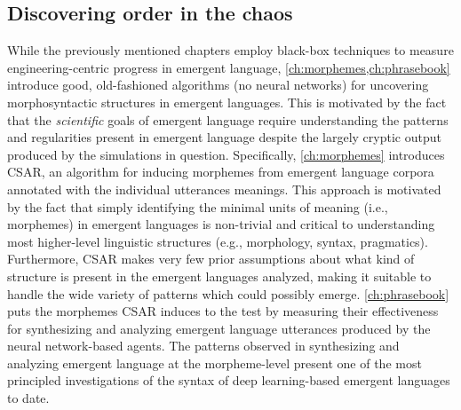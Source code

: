 \subsection{Discovering order in the chaos}%
\label{sec:intro-morph}

While the previously mentioned chapters employ black-box techniques to measure engineering-centric progress in emergent language, \cref{ch:morphemes,ch:phrasebook} introduce good, old-fashioned algorithms (no neural networks) for uncovering morphosyntactic structures in emergent languages.
This is motivated by the fact that the \emph{scientific} goals of emergent language require understanding the patterns and regularities present in emergent language despite the largely cryptic output produced by the simulations in question.
Specifically, \cref{ch:morphemes} introduces CSAR, an algorithm for inducing morphemes from emergent language corpora annotated with the individual utterances meanings.
This approach is motivated by the fact that simply identifying the minimal units of meaning (i.e., morphemes) in emergent languages is non-trivial and critical to understanding most higher-level linguistic structures (e.g., morphology, syntax, pragmatics).
Furthermore, CSAR makes very few prior assumptions about what kind of structure is present in the emergent languages analyzed, making it suitable to handle the wide variety of patterns which could possibly emerge.
\cref{ch:phrasebook} puts the morphemes CSAR induces to the test by measuring their effectiveness for synthesizing and analyzing emergent language utterances produced by the neural network-based agents.
The patterns observed in synthesizing and analyzing emergent language at the morpheme-level present one of the most principled investigations of the syntax of deep learning-based emergent languages to date.

